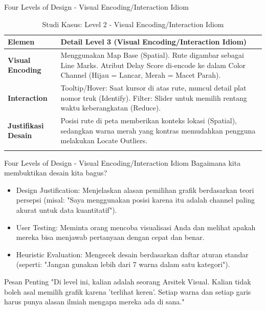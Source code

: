 \documentclass[t]{beamer}
\begin{document}
\begin{frame}{Four Levels of Design - Visual Encoding/Interaction Idiom}

	\begin{table}[h]
    \centering
    \small
    \caption{Studi Kasus: Level 2 - Visual Encoding/Interaction Idiom}
    \vspace{0.3cm}
    \begin{tabularx}{\textwidth}{@{} l >{\RaggedRight\arraybackslash}X @{}}
        \toprule
        \textbf{Elemen} & \textbf{Detail Level 3 (Visual Encoding/Interaction Idiom)} \\ 
        \midrule
        \textbf{Visual Encoding} & Menggunakan Map Base (Spatial). Rute digambar sebagai Line Marks. Atribut Delay Score di-encode ke dalam Color Channel (Hijau = Lancar, Merah = Macet Parah). \\ \addlinespace
        \textbf{Interaction} & Tooltip/Hover: Saat kursor di atas rute, muncul detail plat nomor truk (Identify). Filter: Slider untuk memilih rentang waktu keberangkatan (Reduce). \\ \addlinespace
        \textbf{Justifikasi Desain} & Posisi rute di peta memberikan konteks lokasi (Spatial), sedangkan warna merah yang kontras memudahkan pengguna melakukan Locate Outliers. \\ \addlinespace
        \bottomrule
    \end{tabularx}
	\end{table}
\end{frame}


\begin{frame}{Four Levels of Design - Visual Encoding/Interaction Idiom}
	Bagaimana kita membuktikan desain kita bagus?
	\begin{itemize}
		\item Design Justification: Menjelaskan alasan pemilihan grafik berdasarkan teori persepsi (misal: "Saya menggunakan posisi karena itu adalah channel paling akurat untuk data kuantitatif").

		\item User Testing: Meminta orang mencoba visualisasi Anda dan melihat apakah mereka bisa menjawab pertanyaan dengan cepat dan benar.

		\item Heuristic Evaluation: Mengecek desain berdasarkan daftar aturan standar (seperti: "Jangan gunakan lebih dari 7 warna dalam satu kategori").
	\end{itemize}

	\begin{block}{Pesan Penting}
	"Di level ini, kalian adalah seorang Arsitek Visual. Kalian tidak boleh asal memilih grafik karena 'terlihat keren'. Setiap warna dan setiap garis harus punya alasan ilmiah mengapa mereka ada di sana."
	\end{block}
\end{frame}
\end{document}
